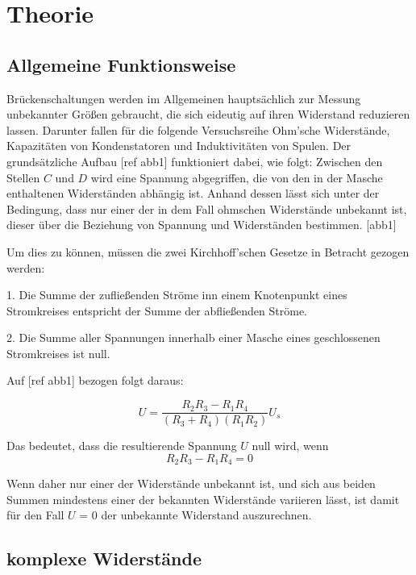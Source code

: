 \section{Theorie}
\label{sec:Theorie}

\subsection{Allgemeine Funktionsweise}

Brückenschaltungen werden im Allgemeinen hauptsächlich zur Messung unbekannter Größen 
gebraucht, die sich eideutig auf ihren Widerstand reduzieren lassen. Darunter fallen für
die folgende Versuchsreihe Ohm'sche Widerstände, Kapazitäten von Kondenstatoren und 
Induktivitäten von Spulen. Der grundsätzliche Aufbau [ref abb1] funktioniert dabei, wie folgt:
Zwischen den Stellen $C$ und $D$ wird eine Spannung abgegriffen, die von den in der Masche 
enthaltenen Widerständen abhängig ist. Anhand dessen lässt sich unter der Bedingung, dass 
nur einer der in dem Fall ohmschen Widerstände unbekannt ist, dieser über die Beziehung
von Spannung und Widerständen bestimmen. 
[abb1]

Um dies zu können, müssen die zwei Kirchhoff'schen Gesetze in Betracht gezogen werden:

1.  Die Summe der zufließenden Ströme inn einem Knotenpunkt eines Stromkreises entspricht
    der Summe der abfließenden Ströme.

2.  Die Summe aller Spannungen innerhalb einer Masche eines geschlossenen Stromkreises
    ist null.

Auf [ref abb1] bezogen folgt daraus:

\begin{equation}
    U = \frac{{R_2}{R_3}-{R_1}{R_4}}{({R_3}+{R_4})({R_1}{R_2})}U_s 
\end{equation}

Das bedeutet, dass die resultierende Spannung $U$ null wird, wenn 
\begin{equation}
    R_2 R_3 - R_1 R_4 = 0
\end{equation}

Wenn daher nur einer der Widerstände unbekannt ist, und sich aus beiden Summen mindestens einer
der bekannten Widerstände variieren lässt, ist damit für den Fall $U$ = 0 der unbekannte Widerstand
auszurechnen.

\subsection{komplexe Widerstände}

